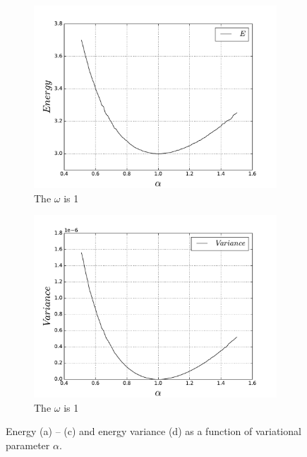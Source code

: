 \documentclass[10pt]{article}
\begin{document}
\begin{figure}[h!]
\begin{subfigure}[b]{0.6\linewidth}
    \centering
    \includegraphics[width=1.1\linewidth]{energy_on_alpha_1} 
    \caption{The $\omega$ is 1} 
    \label{fig1:c} 
  \end{subfigure}%
  \begin{subfigure}[b]{0.6\linewidth}
    \centering
    \includegraphics[width=1.1\linewidth]{variance_on_alpha} 
    \caption{The $\omega$ is 1} 
    \label{fig:d} 
  \end{subfigure} 
  \caption{ Energy (a) -- (c) and energy variance (d) as a function of variational parameter $\alpha$.}
  \label{fig1} 
\end{figure}
\end{document}
